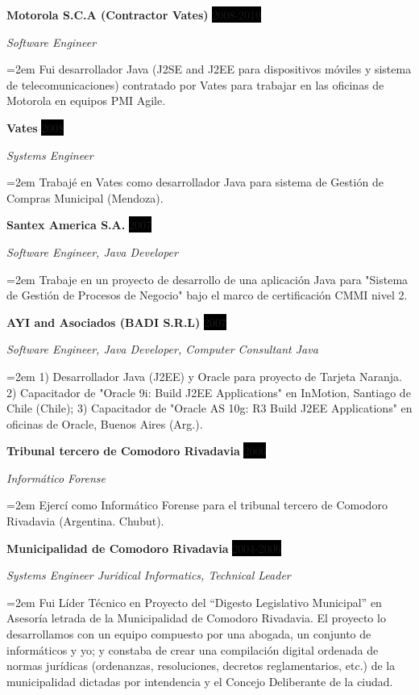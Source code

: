 \documentclass[paper=a4,fontsize=11pt]{scrartcl} %
\newcommand{\sepspace}{\vspace*{1em}}		%
\newcommand{\EducationEntry}[4]{
		\noindent \textbf{#1} \hfill      %
		\colorbox{Black}{%
			\parbox{6em}{%
			\hfill\color{White}#2}} \par  %
		\noindent \textit{#3} \par        %
		\noindent\hangindent=2em\hangafter=0 \small #4 %
		\normalsize \par}
\newcommand{\WorkEntry}[4]{				  %
		\noindent \textbf{#1} \hfill      %
		\colorbox{Black}{\color{White}#2} \par  %
		\noindent \textit{#3} \par              %
		\noindent\hangindent=2em\hangafter=0 \small #4 %
		\normalsize \par}
\begin{document}
\sepspace

\WorkEntry{Motorola S.C.A (Contractor Vates)}{2008-2010}{Software Engineer}
{Fui desarrollador Java (J2SE and J2EE para dispositivos móviles y sistema de telecomunicaciones) contratado por Vates para trabajar en las oficinas de Motorola en equipos PMI Agile.}

\sepspace

\WorkEntry{Vates}{2008}{Systems Engineer}
{Trabajé en Vates como desarrollador Java para sistema de Gestión de Compras Municipal (Mendoza).}

\sepspace

\WorkEntry{Santex America S.A.}{2007}{Software Engineer, Java Developer}
{Trabaje en un proyecto de desarrollo de una aplicación Java para "Sistema de Gestión de Procesos de Negocio" bajo el marco de certificación CMMI nivel 2.}

\sepspace

\WorkEntry{AYI and Asociados (BADI S.R.L)}{2007}{Software Engineer, Java Developer, Computer Consultant Java}
{1) Desarrollador Java (J2EE) y Oracle para proyecto de Tarjeta Naranja.
2) Capacitador de "Oracle 9i: Build J2EE Applications" en InMotion, Santiago de Chile (Chile);
3) Capacitador de "Oracle AS 10g: R3 Build J2EE Applications" en oficinas de Oracle, Buenos Aires (Arg.).
}

\sepspace

\WorkEntry{Tribunal tercero de Comodoro Rivadavia}{2006}{Informático Forense}{
Ejercí como Informático Forense para el tribunal tercero de Comodoro Rivadavia (Argentina. Chubut).}

\sepspace

\WorkEntry{Municipalidad de Comodoro Rivadavia}{2004-2006}{Systems Engineer Juridical Informatics, Technical Leader}
{Fui Líder Técnico en Proyecto del “Digesto Legislativo Municipal” en Asesoría letrada de la Municipalidad de Comodoro Rivadavia. El proyecto lo desarrollamos con un equipo compuesto por una abogada, un conjunto de informáticos y yo; y constaba de crear una compilación digital ordenada de normas jurídicas (ordenanzas, resoluciones, decretos reglamentarios, etc.) de la municipalidad dictadas por intendencia y el Concejo Deliberante de la ciudad.
}
\end{document}

